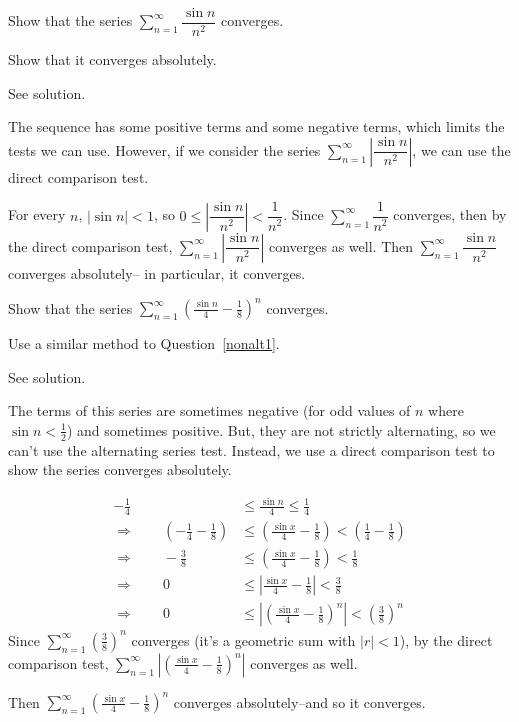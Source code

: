 \begin{question}\label{nonalt1}
Show that the series
$\displaystyle\sum_{n=1}^\infty \dfrac{\sin n}{n^2}$ converges.
\end{question}
\begin{hint}
Show that it converges absolutely.
\end{hint}
\begin{answer}
See solution.
\end{answer}
\begin{solution}
The sequence has some positive terms and some negative terms, which limits the tests we can use. However, if we consider the series $\displaystyle\sum_{n=1}^\infty \left|\dfrac{\sin n}{n^2}\right|$, we can use the direct comparison test.

For every $n$, $| \sin n| <1$, so $0\le \left|\dfrac{\sin n}{n^2}\right|<\dfrac{1}{n^2}$. Since
$\displaystyle\sum_{n=1}^\infty \dfrac{1}{n^2}$ converges, then by the direct comparison test, $\displaystyle\sum_{n=1}^\infty \left|\dfrac{\sin n}{n^2}\right|$ converges as well. Then $\displaystyle\sum_{n=1}^\infty \dfrac{\sin n}{n^2}$ converges absolutely-- in particular, it converges.
\end{solution}
\begin{question}
Show that the series
$\displaystyle\sum_{n=1}^\infty\left(\frac{\sin n}{4}-\frac{1}{8}\right)^n$ converges.
\end{question}
\begin{hint}
Use a similar method to Question~\ref{nonalt1}.
\end{hint}
\begin{answer}
See solution.
\end{answer}
\begin{solution}
The terms of this series are sometimes negative (for odd values of $n$ where  $\sin n <\frac{1}{2}$) and sometimes positive. But, they are not strictly alternating, so we can't use the alternating series test. Instead, we use a direct comparison test to show the series converges absolutely.

\begin{align*}
-\frac14&\le \frac{\sin n}{4} \le \frac14\\
\Rightarrow \qquad\left(-\frac{1}{4}-\frac{1}{8}\right)&\le\left( \frac{\sin x}{4} -\frac18\right)< \left(\frac14-\frac18\right)\\
\Rightarrow \qquad -\frac{3}{8} &\le\left( \frac{\sin x}{4} -\frac18\right)< \frac{1}{8}\\
\Rightarrow \qquad 0 &\le\left| \frac{\sin x}{4} -\frac18\right|< \frac{3}{8}\\
\Rightarrow \qquad 0 &\le\left|\left( \frac{\sin x}{4} -\frac18\right)^n\right|< \left(\frac{3}{8}\right)^n
\end{align*}
Since $\displaystyle\sum_{n=1}^{\infty} \left(\frac{3}{8}\right)^n$ converges (it's a geometric sum with $|r|<1$), by the direct comparison test,
$\displaystyle\sum_{n=1}^{\infty} \left|\left( \frac{\sin x}{4} -\frac18\right)^n\right|$
converges as well.

Then $\displaystyle\sum_{n=1}^{\infty} \left( \frac{\sin x}{4} -\frac18\right)^n$ converges absolutely--and so it converges.
\end{solution}

